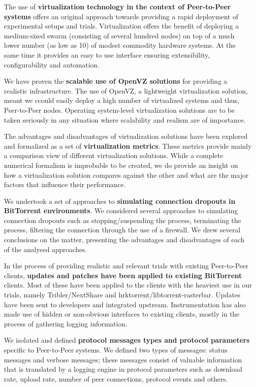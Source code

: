 The use of \textbf{virtualization technology in the context of Peer-to-Peer
systems} offers an original approach towards providing a rapid deployment of
experimental setups and trials. Virtualization offers the benefit of deploying
a medium-sized swarm (consisting of several hundred nodes) on top of a much
lower number (as low as 10) of modest commodity hardware systems. At the same
time it provides an easy to use interface ensuring extensibility,
configurability and automation.

We have proven the \textbf{scalable use of OpenVZ solutions} for providing a
realistic infrastructure. The use of OpenVZ, a lightweight virtualization
solution, meant we ccould easily deploy a high number of virtualized systems
and thus, Peer-to-Peer nodes. Operating system-level virtualization solutions
are to be taken seriously in any situation where scalability and realism are
of importance.

The advantages and disadvantages of virtualization solutions have been
explored and formalized as a set of \textbf{virtualization metrics}. These
metrics provide mainly a comparison view of different virtualization
solutions. While a complete numerical formalism is improbable to be created,
we do provide an insight on how a virtualization solution compares against the
other and what are the major factors that influence their performance.

We undertook a set of approaches to \textbf{simulating connection dropouts in
BitTorrent environments}. We considered several approaches to simulating
connection dropouts such as stopping/suspending the process, terminating the
process, filtering the connection through the use of a firewall. We drew
several conclusions on the matter, presenting the advantages and disadvantages
of each of the analysed approaches.

In the process of providing realistic and relevant trials with existing
Peer-to-Peer clients, \textbf{updates and patches have been applied to
existing BitTorrent} clients. Most of these have been applied to the clients
with the heaviest use in our trials, namely Tribler/NextShare and
hrktorrent/libtorrent-rasterbar. Updates have been sent to developers and
integrated upstream. Instrumentation has also made use of hidden or
non-obvious interfaces to existing clients, mostly in the process of gathering
logging information.

We isolated and defined \textbf{protocol messages types and protocol
parameters} specific to Peer-to-Peer systems. We defined two types of
messages: status messages and verbose messages; these messages consist of
valuable information that is translated by a logging engine in protocol
parameters such as download rate, upload rate, number of peer connections,
protocol events and others.

